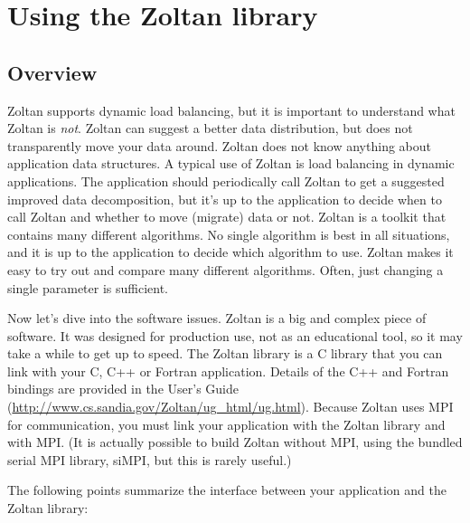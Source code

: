 %
%
\chapter{Using the Zoltan library}
\label{cha:using}


\section{Overview}

Zoltan supports dynamic load balancing, but it is important
to understand what Zoltan is \emph{not}. Zoltan can suggest
a better data distribution, but does not transparently move
your data around. Zoltan does not know anything about application
data structures. A typical use of Zoltan is
load balancing in dynamic applications. The application
should periodically call Zoltan to get a suggested improved
data decomposition, but it's up to the application to
decide when to call Zoltan and whether to move (migrate) data or not.
Zoltan is a toolkit that contains many different algorithms.
No single algorithm is best in all situations, and it is
up to the application to decide which algorithm to use.
Zoltan makes it easy to try out and compare many different
algorithms. Often, just changing a single parameter is sufficient.

Now let's dive into the software issues. Zoltan is a big and complex
piece of software. It was designed for production use, not as an educational
tool, so it may take a while to get up to speed.
The Zoltan library is a C library that you can link with your C,
C++ or Fortran application.  Details of the C++ and Fortran bindings
are provided in the User's Guide
(\url{http://www.cs.sandia.gov/Zoltan/ug_html/ug.html}).
Because Zoltan uses MPI for communication, you must link your application
with the Zoltan library and with MPI. (It is actually possible to build
Zoltan without MPI, using the bundled serial MPI library, siMPI,
but this is rarely useful.)

The following points summarize the interface between your
application and the Zoltan library:


